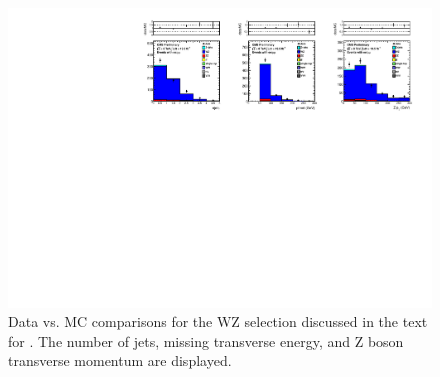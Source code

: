 \begin{figure}[tbh]
\begin{center}
\includegraphics[width=1\linewidth]{plots/WZ_19p5fb.pdf}
\caption{\label{fig:wz}\protect 
Data vs. MC comparisons for the WZ selection discussed in the text for \lumi. 
The number of jets, missing transverse energy, and Z boson transverse momentum are displayed.
}

\end{center}
\end{figure}
